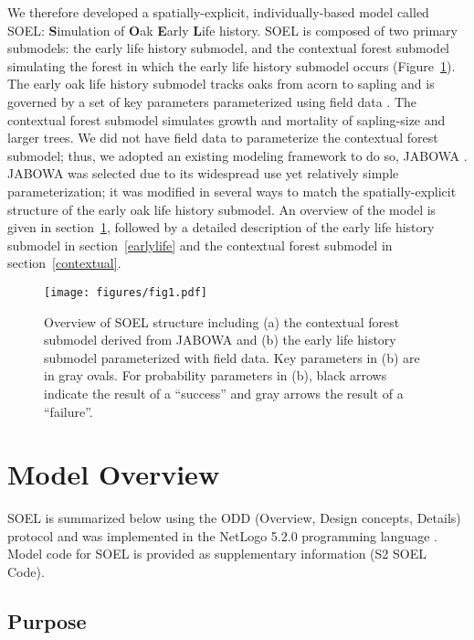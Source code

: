 \documentclass[
11pt, %
a4paper, %
oneside, %
headinclude,footinclude, %
]{scrartcl}
\begin{document}
We therefore developed a spatially-explicit, individually-based model called SOEL: \textbf{S}imulation of \textbf{O}ak \textbf{E}arly \textbf{L}ife history. SOEL is composed of two primary submodels: the early life history submodel, and the contextual forest submodel simulating the forest in which the early life history submodel occurs (Figure~\ref{fig:1}). The early oak life history submodel tracks oaks from acorn to sapling and is governed by a set of key parameters parameterized using field data \citep{Kellner2014b, Kellner2015a, Kellner2016}. The contextual forest submodel simulates growth and mortality of sapling-size and larger trees. We did not have field data to parameterize the contextual forest submodel; thus, we adopted an existing modeling framework to do so, JABOWA \citep{Botkin1993}. JABOWA was selected due to its widespread use yet relatively simple parameterization; it was modified in several ways to match the spatially-explicit structure of the early oak life history submodel. An overview of the model is given in section~\ref{overview}, followed by a detailed description of the early life history submodel in section~\ref{earlylife} and the contextual forest submodel in section~\ref{contextual}.

\begin{figure}
	\centering
	\texttt{[image: figures/fig1.pdf]}
	\caption{Overview of SOEL structure including (a) the contextual forest submodel derived from JABOWA and (b) the early life history submodel parameterized with field data. Key parameters in (b) are in gray ovals. For probability parameters in (b), black arrows indicate the result of a ``success'' and gray arrows the result of a ``failure''.}
	\label{fig:1}
\end{figure}

\section{Model Overview}
\label{overview}

SOEL is summarized below using the ODD (Overview, Design concepts, Details) protocol \citep{Grimm2010} and was implemented in the NetLogo 5.2.0 programming language \citep{Wilensky1999}. Model code for SOEL is provided as supplementary information (S2 SOEL Code).

\subsection{Purpose}
\end{document}
